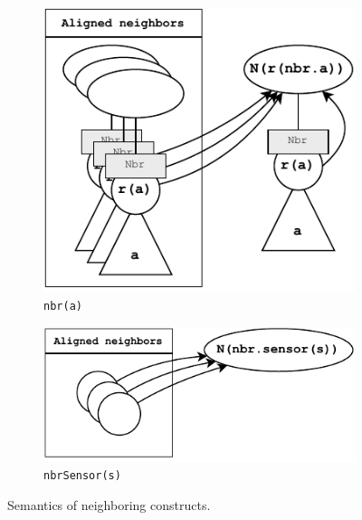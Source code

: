 \begin{figure}
    \centering
    \begin{subfigure}[b]{0.47\textwidth}
        \centering
        \includegraphics[width=\textwidth]{figures/semantics/nbr.pdf}
        \caption{\texttt{nbr(a)}}
        \label{fig:semantics-nbr}
    \end{subfigure}
    \hfill
    \begin{subfigure}[b]{0.47\textwidth}
        \centering
        \includegraphics[width=\textwidth]{figures/semantics/nbrSensor.pdf}
        \caption{\texttt{nbrSensor(s)}}
        \label{fig:semantics-nbrsensor}
    \end{subfigure}
    \caption{Semantics of neighboring constructs.}
    \label{fig:semantics-neighboring}
\end{figure}

